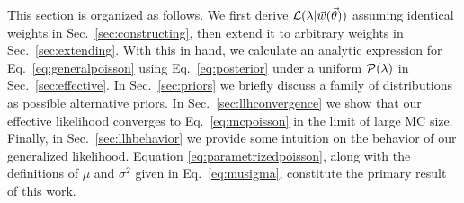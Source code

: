 This section is organized as follows. We first derive $\mathcal{L}(\lambda|\vec{w}(\vec{\theta}))$ assuming identical weights in Sec.~\ref{sec:constructing}, then extend it to arbitrary weights in Sec.~\ref{sec:extending}. With this in hand, we calculate an analytic expression for Eq.~\eqref{eq:generalpoisson} using Eq.~\eqref{eq:posterior} under a uniform $\mathcal{P}(\lambda)$ in Sec.~\ref{sec:effective}. In Sec.~\ref{sec:priors} we briefly discuss a family of distributions as possible alternative priors. In Sec.~\ref{sec:llhconvergence} we show that our effective likelihood converges to Eq.~\eqref{eq:mcpoisson} in the limit of large MC size. Finally, in Sec.~\ref{sec:llhbehavior} we provide some intuition on the behavior of our generalized likelihood. Equation \eqref{eq:parametrizedpoisson}, along with the definitions of $\mu$ and $\sigma^2$ given in Eq.~\eqref{eq:musigma}, constitute the primary result of this work.
